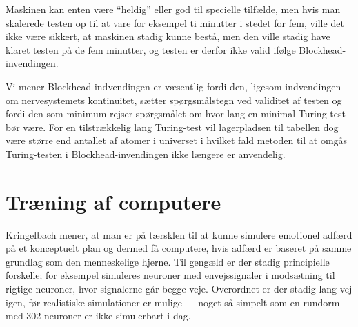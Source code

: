 \documentclass{article}
\begin{document}
Maskinen kan enten være ``heldig'' eller god til specielle tilfælde, men hvis man skalerede testen op til at vare for eksempel ti minutter i stedet for fem, ville det ikke være sikkert, at maskinen stadig kunne bestå, men den ville stadig have klaret testen på de fem minutter, og testen er derfor ikke valid ifølge Blockhead-invendingen.

Vi mener Blockhead-indvendingen er væsentlig fordi den, ligesom indvendingen om nervesystemets kontinuitet, sætter spørgsmålstegn ved validitet af testen og fordi den som minimum rejser spørgsmålet om hvor lang en minimal Turing-test bør være. For en tilstrækkelig lang Turing-test vil lagerpladsen til tabellen dog være større end antallet af atomer i universet i hvilket fald metoden til at omgås Turing-testen i Blockhead-invendingen ikke længere er anvendelig.

\section{Træning af computere}
Kringelbach mener, at man er på tærsklen til at kunne simulere emotionel adfærd på et konceptuelt plan og dermed få computere, hvis adfærd er baseret på samme grundlag som den menneskelige hjerne. Til gengæld er der stadig principielle forskelle; for eksempel simuleres neuroner med envejssignaler i modsætning til rigtige neuroner, hvor signalerne går begge veje. Overordnet er der stadig lang vej igen, før realistiske simulationer er mulige --- noget så simpelt som en rundorm med 302 neuroner er ikke simulerbart i dag.
\end{document}
